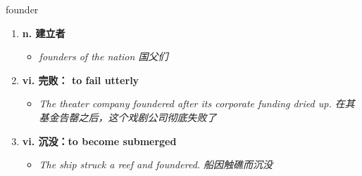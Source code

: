 
\begin{frame}
{\huge founder}
\begin{center}
\begin{enumerate}\Large
  \item \textbf{n. 建立者}
  \begin{itemize}
    \item \em{\Large{founders of the nation 国父们}}
  \end{itemize}
  \item \textbf{vi. 完败： to fail utterly}
  \begin{itemize}
    \item \em{\Large{The theater company foundered after its corporate funding dried up. 在其基金告罄之后，这个戏剧公司彻底失败了}}
  \end{itemize}
  \item \textbf{vi. 沉没：to become submerged}
  \begin{itemize}
    \item \em{\Large{The ship struck a reef and foundered. 船因触礁而沉没}}
  \end{itemize}
\end{enumerate}
\end{center}
\end{frame}

